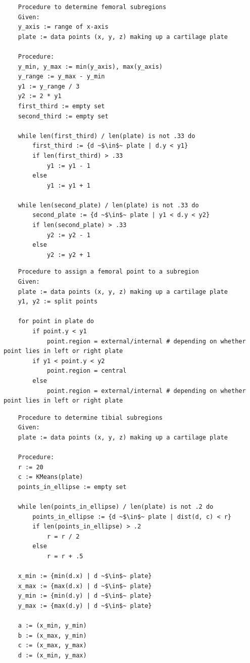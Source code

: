\begin{verbatim}
	Procedure to determine femoral subregions
	Given:
	y_axis := range of x-axis
	plate := data points (x, y, z) making up a cartilage plate
	
	Procedure:
	y_min, y_max := min(y_axis), max(y_axis)
	y_range := y_max - y_min
	y1 := y_range / 3
	y2 := 2 * y1
	first_third := empty set
	second_third := empty set
	
	while len(first_third) / len(plate) is not .33 do
		first_third := {d ~$\in$~ plate | d.y < y1}
		if len(first_third) > .33 
			y1 := y1 - 1
		else
			y1 := y1 + 1
	
	while len(second_plate) / len(plate) is not .33 do
		second_plate := {d ~$\in$~ plate | y1 < d.y < y2}
		if len(second_plate) > .33
			y2 := y2 - 1
		else
			y2 := y2 + 1
\end{verbatim}
\begin{verbatim}
	Procedure to assign a femoral point to a subregion
	Given:
	plate := data points (x, y, z) making up a cartilage plate
	y1, y2 := split points
	
	for point in plate do
		if point.y < y1
			point.region = external/internal # depending on whether point lies in left or right plate
		if y1 < point.y < y2
			point.region = central
		else
			point.region = external/internal # depending on whether point lies in left or right plate
\end{verbatim}
\begin{verbatim}
	Procedure to determine tibial subregions
	Given:
	plate := data points (x, y, z) making up a cartilage plate
	
	Procedure:
	r := 20
	c := KMeans(plate)
	points_in_ellipse := empty set
	
	while len(points_in_ellipse) / len(plate) is not .2 do
		points_in_ellipse := {d ~$\in$~ plate | dist(d, c) < r}
		if len(points_in_ellipse) > .2
			r = r / 2
		else
			r = r + .5
	
	x_min := {min(d.x) | d ~$\in$~ plate}
	x_max := {max(d.x) | d ~$\in$~ plate}
	y_min := {min(d.y) | d ~$\in$~ plate}
	y_max := {max(d.y) | d ~$\in$~ plate}
	
	a := (x_min, y_min)
	b := (x_max, y_min)
	c := (x_max, y_max)
	d := (x_min, y_max)
\end{verbatim}
